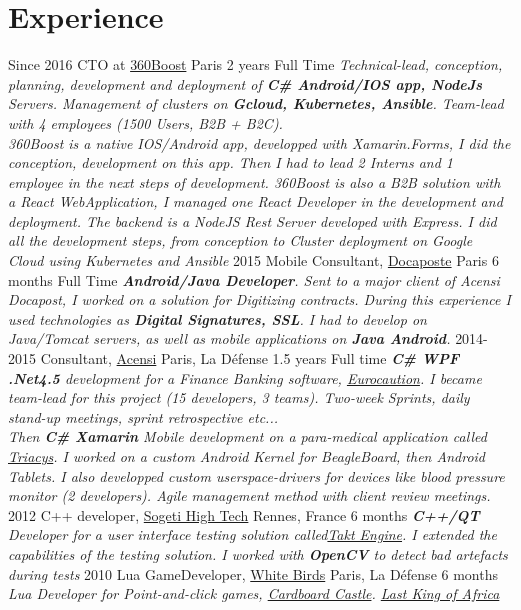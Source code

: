 \documentclass{emonides-cv}
\begin{document}
\section{Experience}
\begin{entrylist}
  \entry
    {Since  2016}
    {CTO at \href{https://360boost.com/}{360Boost}  {\normalfont Paris}}
    {2 years Full Time}
    {\emph{Technical-lead, conception, planning, development and deployment of \textbf{C\# Android/IOS app, NodeJs} Servers.
     Management of clusters on \textbf{Gcloud, Kubernetes, Ansible}. Team-lead with 4 employees (1500 Users, B2B + B2C).
    \\360Boost is a native IOS/Android app, developped with Xamarin.Forms, I did the conception, development on this app.
    Then I had to lead 2 Interns and 1 employee in the next steps of development.
    360Boost is also a B2B solution with a React WebApplication, I managed one React Developer
    in the development and deployment.
    The backend is a NodeJS Rest Server developed with Express. I did all the development steps, from conception 
    to Cluster deployment on Google Cloud using Kubernetes and Ansible}}
  \entry
    {2015}
    {Mobile Consultant, \href{https://www.docapost.com/en/}{Docaposte} {\normalfont Paris}}
    {6 months Full Time}
    {\emph{\textbf{Android/Java Developer}. Sent to a major client of Acensi Docapost, I worked on a solution for Digitizing contracts.
    During this experience I used technologies as \textbf{Digital Signatures, SSL}.
    I had to develop on Java/Tomcat servers, as well as mobile applications on \textbf{Java Android}.}}
  \entry
    {2014-2015}
    {Consultant, \href{https://www.acensi.fr/}{Acensi} {\normalfont Paris, La Défense}}
    {1.5 years Full time}
    {\emph{\textbf{C\# WPF .Net4.5} development for a Finance Banking software, \href{https://www.eurocaution.net/}{Eurocaution}.
    I became team-lead for this project (15 developers, 3 teams). Two-week Sprints, daily stand-up meetings, sprint retrospective etc...
    \\Then \textbf{C\# Xamarin} Mobile development on a para-medical application called \href{http://www.triacys.com/}{Triacys}.
    I worked on a custom Android Kernel for BeagleBoard, then Android Tablets. I also developped custom userspace-drivers for devices like blood pressure monitor
    (2 developers). Agile management method with client review meetings. }}
  \entry
    {2012}
    {C++ developer, \href{https://www.acensi.fr/}{Sogeti High Tech} {\normalfont Rennes, France}}
    {6 months}
    {\emph{\textbf{C++/QT} Developer for a user interface testing solution called\href{https://www.eurocaution.net/}{Takt Engine}.
    I extended the capabilities of the testing solution. I worked with \textbf{OpenCV} to detect bad artefacts during tests }}
  \entry
    {2010}
    {Lua GameDeveloper, \href{https://www.giantbomb.com/white-birds-productions/3010-5637/}{White Birds} {\normalfont Paris, La Défense}}
    {6 months}
    {\emph{Lua Developer for Point-and-click games, \href{https://www.bigfishgames.com/games/6859/cardboard-castle/}{Cardboard Castle}. \href{https://www.wikiwand.com/fr/White_Birds_Productions}{Last King of Africa}}}
\end{entrylist}
\end{document}
